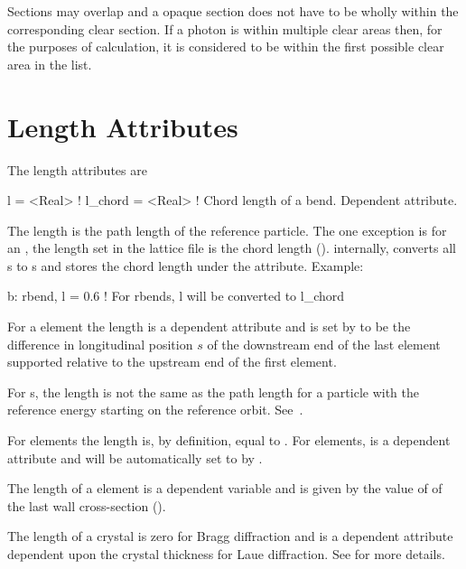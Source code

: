 Sections may overlap and a opaque section does not have to be wholly
within the corresponding clear section. If a photon is within multiple
clear areas then, for the purposes of calculation, it is considered to
be within the first possible clear area in the list.

\section{Length Attributes}
\label{s:l}

The length attributes are
\begin{example}
  l       = <Real>  ! 
  l_chord = <Real>  ! Chord length of a bend. Dependent attribute.
\end{example}
The length  is the path length of the reference particle. The
one exception is for an , the length  set in the
lattice file is the chord length (). internally, \bmad
converts all s to s and stores the chord length
under the  attribute.
Example:
\begin{example}
  b: rbend, l = 0.6   ! For rbends, l will be converted to l_chord
\end{example}

For a  element the length  is a dependent attribute
and is set by \bmad to be the difference in longitudinal position $s$
of the downstream end of the last element supported relative to the
upstream end of the first element. 

For s, the length  is not the same as the
path length for a particle with the reference energy starting on the
reference orbit. See~.

For  elements the  length is, by definition, equal to
. For  elements,  is a dependent
attribute and will be automatically set to  by \bmad.

The length of a  element is a dependent variable and is
given by the value of  of the last wall cross-section
().

The length of a crystal is zero for Bragg diffraction and is a
dependent attribute dependent upon the crystal thickness for Laue
diffraction. See  for more details.

